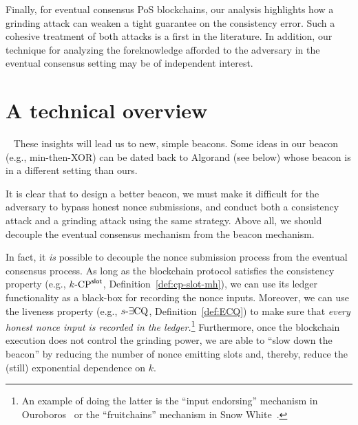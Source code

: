     Finally, for eventual consensus PoS blockchains, 
    our analysis highlights 
    how a grinding attack can weaken a tight guarantee on the consistency error. 
    Such a cohesive treatment of both attacks is a first in the literature.
    In addition, our technique for analyzing 
    the foreknowledge afforded to the adversary in the eventual consensus setting 
    may be of independent interest.




\section{A technical overview}~
    These insights will lead us to new, simple beacons. 
    Some ideas in our beacon (e.g., min-then-XOR) can be dated back to Algorand (see below) 
    whose beacon is in a different setting than ours.

    It is clear that to design a better beacon, 
    we must make it difficult for the adversary to 
    bypass honest nonce submissions, 
    and conduct both a consistency attack and a grinding attack using the same strategy. 
    Above all, we should decouple the eventual consensus mechanism 
    from the beacon mechanism.

    In fact, it \emph{is} possible to decouple the nonce submission process from the eventual consensus process. 
    As long as the blockchain protocol satisfies the consistency property (e.g., ${k}\text{-}\mathrm{CP}^{\mathsf{slot}}$, Definition~\ref{def:cp-slot-mh}), 
    we can use its ledger functionality as a black-box for recording the nonce inputs. 
    Moreover, we can use the liveness property (e.g., ${s}\text{-}\exists\mathrm{CQ}$, Definition~\ref{def:ECQ}) 
    to make sure that \emph{every honest nonce input is recorded in the ledger.}\footnote{ 
        An example of doing the latter is the ``input endorsing'' mechanism in Ouroboros~\cite{Ouroboros} 
        or the ``fruitchains'' mechanism in Snow White~\cite{SnowWhite,Fruitchains}.
    }
    Furthermore, once the blockchain execution does not control the grinding power, 
    we are able to ``slow down the beacon'' by reducing the number of nonce emitting slots 
    and, thereby, reduce the (still) exponential dependence on $k$.



